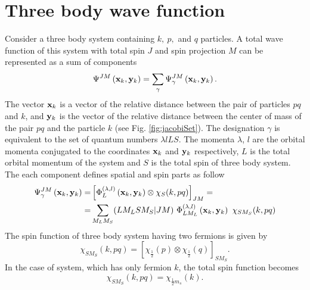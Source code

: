 \documentclass[
12pt, %
oneside, %
english, %
doublespacing, %
doublespacing, %
toctotoc, %
parskip, %
headsepline, %
]{MastersDoctoralThesis} %
\begin{document}
\section{Three body wave function}
Consider a three body system containing $k,~p,$ and $q$ particles. 
 A total wave function of this system with total spin $ J $ and spin projection $ M $ can be represented as a sum of components
 \begin{equation}
\Psi^{JM}\left( {\bf x}_k, {\bf y}_k \right)=\sum_\gamma\Psi^{ J M}_\gamma\left( {\bf x}_k, {\bf y}_k \right).
 \label{totwf}
 \end{equation}
The vector $ {\bf x}_k $ is a vector of the relative distance between the pair of particles $ pq $ and $ k $, and $ {\bf y}_k $ is the vector of the relative distance between the center of mass of the pair $ pq $ and the particle $ k $ (see Fig. \ref{fig:jacobiSet}). 
The designation $\gamma$ is equivalent to the set of quantum numbers  $\lambda l L S$.
The momenta $ \lambda $, $ l $ are the orbital momenta conjugated to the coordinates $ {\bf x} _k $ and $ {\bf y} _k $ respectively, $ L $ is the total orbital momentum of the system and $S$ is the total spin of three body system.  
The each component defines spatial and spin parts as follow
\begin{align}
\Psi^{ J M}_\gamma\left( {\bf x}_k, {\bf y}_k \right) = & \left[
\Phi^{(\lambda,l)}_L \left({\bf x}_k, {\bf y}_k \right) \otimes
\chi_S(k, pq)
\right]_{JM} =  \\
=& 
\sum_{M_L M_S} (LM_LSM_S | JM) ~
\Phi^{(\lambda,l)}_{LM_L}\left( {\bf x}_k, {\bf y}_k \right)~
\chi_{SM_S}(k, pq) \nonumber
\end{align}
The spin function of three body system having two fermions is given by
\begin{equation}
\chi_{SM_S}(k, pq)= \left[ \chi_{\tfrac{1}{2}}(p) \otimes \chi_{\tfrac{1}{2}}(q)	\right]_{SM_S}.
\end{equation}
In the case of system, which has only fermion $k$, the total spin function becomes 
\begin{equation}
\chi_{SM_S}(k, pq)=
 \chi_{\tfrac{1}{2}m_s}(k) .
\end{equation}
\end{document}
